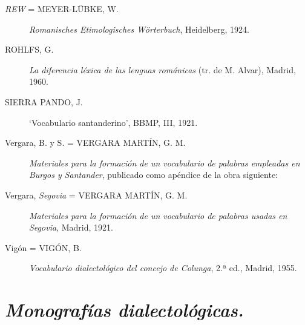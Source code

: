 \begin{description}
\item[\textit{REW} = MEYER-LÜBKE, W.] \textit{Romanisches Etimologisches Wörterbuch}, Heidelberg, 1924. 
\item[ROHLFS, G.] \textit{La diferencia léxica de las lenguas románicas} (tr. de M. Alvar), Madrid, 1960. 
\item[SIERRA PANDO, J.] `Vocabulario santanderino', BBMP, III, 1921.  
\item[Vergara, B. y S. = VERGARA MARTÍN, G. M.] \textit{Materiales para la formación de un vocabulario de palabras empleadas en Burgos y Santander}, publicado como apéndice de la obra siguiente: 
\item[Vergara, \textit{Segovia} = VERGARA MARTÍN, G. M.] \textit{Materiales para la formación de un vocabulario de palabras usadas en Segovia}, Madrid, 1921.
\item[Vigón = VIGÓN, B.] \textit{Vocabulario dialectológico del concejo de Colunga}, 2.ª ed., Madrid, 1955.
\end{description}


\section{\emph{Monografías dialectológicas.}}

